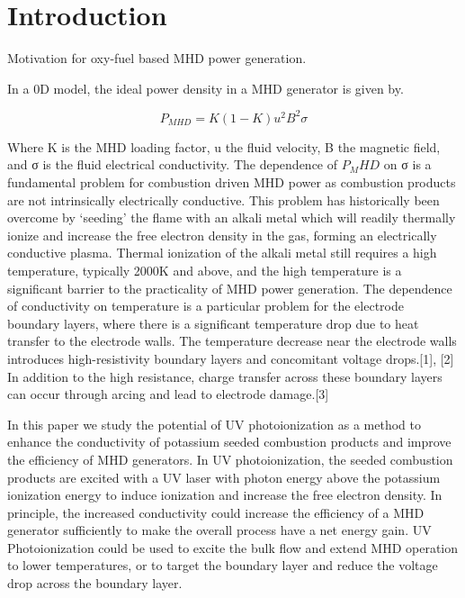 

\section{Introduction}

Motivation for oxy-fuel based MHD power generation.

In a 0D model, the ideal power density in a MHD generator is given by. 

\begin{equation}
P_{MHD} = K(1-K) u^2 B^2 \sigma
\label{eq:mhd_ideal_power}
\end{equation}


Where K is the MHD loading factor, u the fluid velocity, B the magnetic field, and σ is the fluid electrical conductivity. The dependence of $P_MHD$ on σ is a fundamental problem for combustion driven MHD power as combustion products are not intrinsically electrically conductive. This problem has historically been overcome by ‘seeding’ the flame with an alkali metal which will readily thermally ionize and increase the free electron density in the gas, forming an electrically conductive plasma. Thermal ionization of the alkali metal still requires a high temperature, typically 2000K and above, and the high temperature is a significant barrier to the practicality of MHD power generation. The dependence of conductivity on temperature is a particular problem for the electrode boundary layers, where there is a significant temperature drop due to heat transfer to the electrode walls. The temperature decrease near the electrode walls introduces high-resistivity boundary layers and concomitant voltage drops.[1], [2] In addition to the high resistance, charge transfer across these boundary layers can occur through arcing and lead to electrode damage.[3] 


In this paper we study the potential of UV photoionization as a method to enhance the conductivity of potassium seeded combustion products and improve the efficiency of MHD generators. In UV photoionization, the seeded combustion products are excited with a UV laser with photon energy above the potassium ionization energy to induce ionization and increase the free electron density. In principle, the increased conductivity could increase the efficiency of a MHD generator sufficiently to make the overall process have a net energy gain. UV Photoionization could be used to excite the bulk flow and extend MHD operation to lower temperatures, or to target the boundary layer and reduce the voltage drop across the boundary layer.



